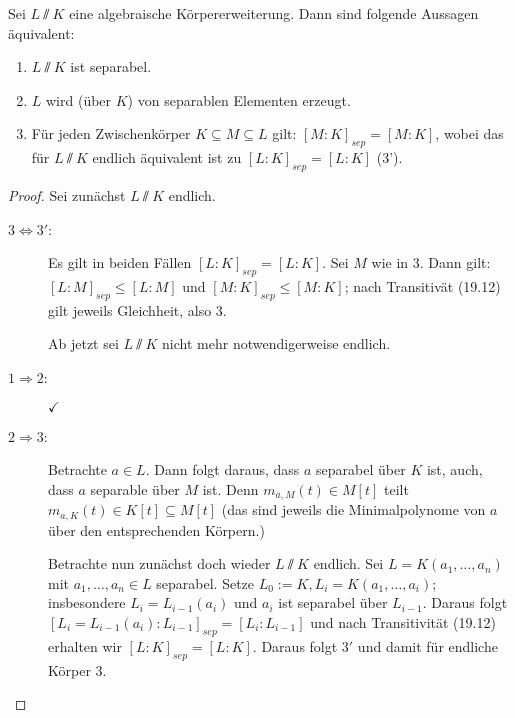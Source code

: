 \documentclass[12pt,a4paper]{scrartcl}
\begin{document}
\begin{lem}
	Sei $L\sslash K$ eine algebraische Körpererweiterung. Dann sind folgende Aussagen äquivalent:
	\begin{enumerate}
		\item $L\sslash K$ ist separabel.
		\item $L$ wird (über $K$) von separablen Elementen erzeugt.
		\item Für jeden Zwischenkörper $K\subseteq M \subseteq L$ gilt: $[M:K]_{sep} = [M:K]$, wobei das für $L\sslash K$ endlich äquivalent ist zu $[L:K]_{sep} = [L:K]$ (3').
	\end{enumerate}	
\end{lem}
\begin{proof}
	Sei zunächst $L\sslash K$ endlich.
	\begin{description}
		\item[$3\Leftrightarrow 3'$:] Es gilt in beiden Fällen $[L:K]_{sep} = [L:K]$. Sei $M$ wie in $3$. Dann gilt: $[L:M]_{sep} \leq [L:M]$ und $[M:K]_{sep}\leq [M:K]$; nach Transitivät (19.12) gilt jeweils Gleichheit, also $3$.
		
		Ab jetzt sei $L\sslash K$ nicht mehr notwendigerweise endlich.
		\item[$1\Rightarrow 2$:]  $\checkmark$
		\item[$2\Rightarrow 3$:] Betrachte $a\in L$. Dann folgt daraus, dass $a$ separabel über $K$ ist, auch, dass $a$ separable über $M$ ist. Denn $m_{a,M}(t)\in M[t]$ teilt $m_{a, K}(t)\in K[t]\subseteq M[t] $ (das sind jeweils die Minimalpolynome von $a$ über den entsprechenden Körpern.)
		
		Betrachte nun zunächst doch wieder $L\sslash K$ endlich. Sei $L = K(a_1,\dots, a_n)$ mit $a_1, \dots, a_n\in L$ separabel. Setze $L_0:= K, L_i = K(a_1,\dots, a_i)$; insbesondere $L_i = L_{i-1}(a_i)$ und $a_i$ ist separabel über $L_{i-1}$. Daraus folgt $[L_i = L_{i-1}(a_i):L_{i-1}]_{sep} = [L_i:L_{i-1}]$ und nach Transitivität (19.12) erhalten wir $[L:K]_{sep} = [L:K]$. Daraus folgt $3'$ und damit für endliche Körper $3$.
		

\end{description}
\end{proof}
\end{document}
